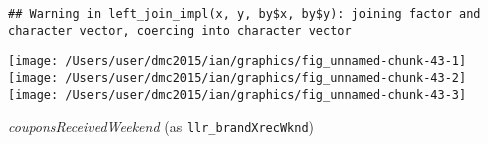 \documentclass[10pt]{report}
\newenvironment{Shaded}{}{}
\newcommand{\KeywordTok}[1]{\textcolor[rgb]{0.00,0.44,0.13}{\textbf{{#1}}}}
\newcommand{\DataTypeTok}[1]{\textcolor[rgb]{0.56,0.13,0.00}{{#1}}}
\newcommand{\StringTok}[1]{\textcolor[rgb]{0.25,0.44,0.63}{{#1}}}
\newcommand{\NormalTok}[1]{{#1}}
\begin{document}
\begin{Shaded}
\end{Shaded}

\begin{verbatim}
## Warning in left_join_impl(x, y, by$x, by$y): joining factor and character vector, coercing into character vector
\end{verbatim}

\begin{Shaded}
\end{Shaded}

\begin{center}\texttt{[image: /Users/user/dmc2015/ian/graphics/fig\_unnamed-chunk-43-1]} \texttt{[image: /Users/user/dmc2015/ian/graphics/fig\_unnamed-chunk-43-2]} \texttt{[image: /Users/user/dmc2015/ian/graphics/fig\_unnamed-chunk-43-3]} \end{center}

\emph{couponsReceivedWeekend} (as \texttt{llr\_brandXrecWknd})
\end{document}
